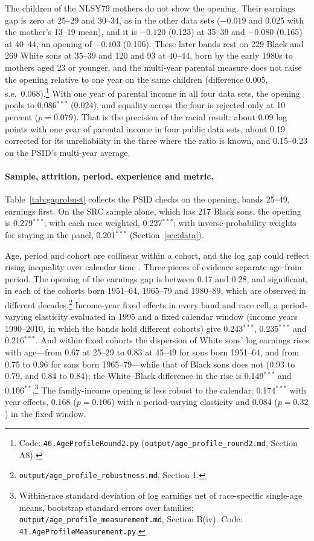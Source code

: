 The children of the NLSY79 mothers do not show the opening. Their earnings gap is zero at 25--29 and 30--34, as in the
other data sets ($-0.019$ and 0.025 with the mother's 13--19 mean), and it is $-0.120$ (0.123) at 35--39 and $-0.080$
(0.165) at 40--44, an opening of $-0.103$ (0.106). These later bands rest on 229 Black and 269 White sons at 35--39 and
120 and 93 at 40--44, born by the early 1980s to mothers aged 23 or younger, and the multi-year parental measure does
not raise the opening relative to one year on the same children (difference 0.005, s.e.\ 0.068).\footnote{Code:
\texttt{46.AgeProfileRound2.py} (\texttt{output/age\_profile\_round2.md}, Section A8).} With one year of parental
income in all four data sets, the opening pools to 0.086$^{***}$ (0.024), and equality across the four is rejected only
at 10 percent ($p=0.079$). That is the precision of the racial result: about 0.09 log points with one year of parental
income in four public data sets, about 0.19 corrected for its unreliability in the three where the ratio is known, and
0.15--0.23 on the PSID's multi-year average.



\paragraph{Sample, attrition, period, experience and metric.} Table~\ref{tab:gaprobust} collects the PSID checks on the
opening, bands 25--49, earnings first. On the SRC sample alone, which has 217 Black sons, the opening is 0.279$^{***}$;
with each race weighted, 0.227$^{***}$; with inverse-probability weights for staying in the panel, 0.201$^{***}$
(Section~\ref{sec:data}).

Age, period and cohort are collinear within a cohort, and the log gap could reflect rising inequality over calendar
time \citep{bayer2018divergent}. Three pieces of evidence separate age from period. The opening of the earnings gap is
between 0.17 and 0.28, and significant, in each of the cohorts born 1951--64, 1965--79 and 1980--89, which are observed
in different decades.\footnote{\texttt{output/age\_profile\_robustness.md}, Section 1.} Income-year fixed effects in every
band and race cell, a period-varying elasticity evaluated in 1995 and a fixed calendar window (income years 1990--2010,
in which the bands hold different cohorts) give 0.243$^{***}$, 0.235$^{***}$ and 0.216$^{***}$. And within fixed cohorts
the dispersion of White sons' log earnings rises with age---from 0.67 at 25--29 to 0.83 at 45--49 for sons born 1951--64,
and from 0.75 to 0.96 for sons born 1965--79---while that of Black sons does not (0.93 to 0.79, and 0.84 to 0.84); the
White--Black difference in the rise is 0.149$^{***}$ and 0.106$^{**}$.\footnote{Within-race standard deviation of log
earnings net of race-specific single-age means, bootstrap standard errors over families;
\texttt{output/age\_profile\_measurement.md}, Section B(iv). Code: \texttt{41.AgeProfileMeasurement.py}.} The
family-income opening is less robust to the calendar: 0.174$^{***}$ with year effects, 0.168 ($p=0.106$) with a
period-varying elasticity and 0.084 ($p=0.32$) in the fixed window.

